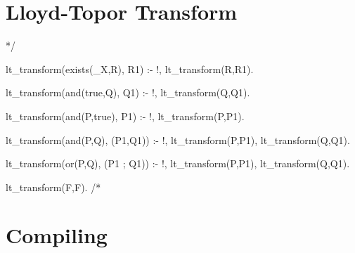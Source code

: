 \documentclass{book}[9pt]
\newenvironment{code}%
{\small \verbatim}%
{\endverbatim \large}
\begin{document}
\section{Lloyd-Topor Transform}

\begin{code}
*/

lt_transform(exists(_X,R), R1) :- !,
        lt_transform(R,R1).

lt_transform(and(true,Q), Q1) :- !,
        lt_transform(Q,Q1).

lt_transform(and(P,true), P1) :- !,
        lt_transform(P,P1).

lt_transform(and(P,Q), (P1,Q1)) :- !,
        lt_transform(P,P1),
        lt_transform(Q,Q1).

lt_transform(or(P,Q), (P1 ; Q1)) :- !,
        lt_transform(P,P1),
        lt_transform(Q,Q1).

lt_transform(F,F).
/*
\end{code}


\section{Compiling}
\end{document}
